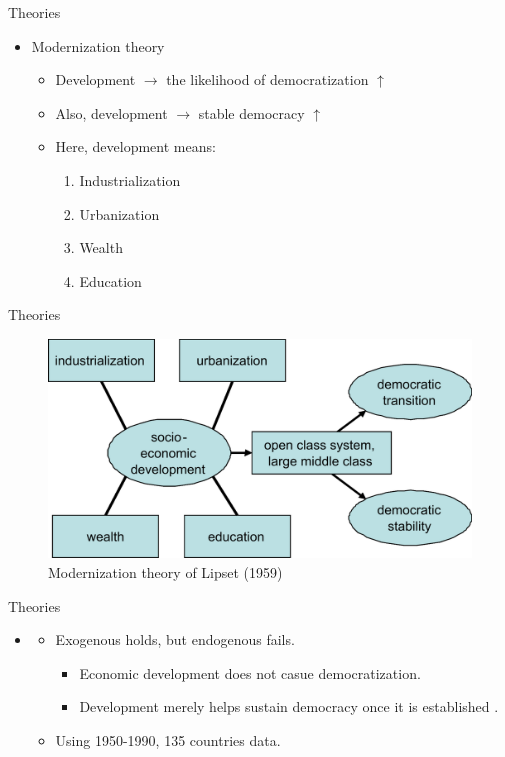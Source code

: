 \documentclass[xcolor=dvipsnames]{beamer}
\begin{document}
	\begin{frame}[fragile]{Theories}
	\begin{itemize}
		\item Modernization theory \citep{lipset:1959}
			\begin{itemize}
				\item Development $\rightarrow$ the likelihood of democratization $\uparrow$ \pause
				\item Also, development $\rightarrow$ stable democracy $\uparrow$ \pause
				\item Here, development means:
				\begin{enumerate}
				  \item Industrialization
				  \item Urbanization
				  \item Wealth
				  \item Education
				\end{enumerate}
			\end{itemize}
		\end{itemize}
	\end{frame}
	
	\begin{frame}[fragile]{Theories}
	\begin{figure}
	\centering
	\includegraphics{modernization theory.png}
	\caption{Modernization theory of Lipset (1959)}
	\end{figure}
	\end{frame}
	
\begin{frame}[fragile]{Theories}
	\begin{itemize}
		\item \citet{przeworskietal:2000}
    \begin{itemize}
      \item Exogenous holds, but endogenous fails.
        \begin{itemize}
          \item Economic development does not casue democratization.
          \item Development merely helps sustain democracy once it is established  \citep[3]{wucherpfennig:Deutsch:2009}.
        \end{itemize}
      \item Using 1950-1990, 135 countries data.
    \end{itemize}
	\end{itemize}
\end{frame}
	
\end{document}
